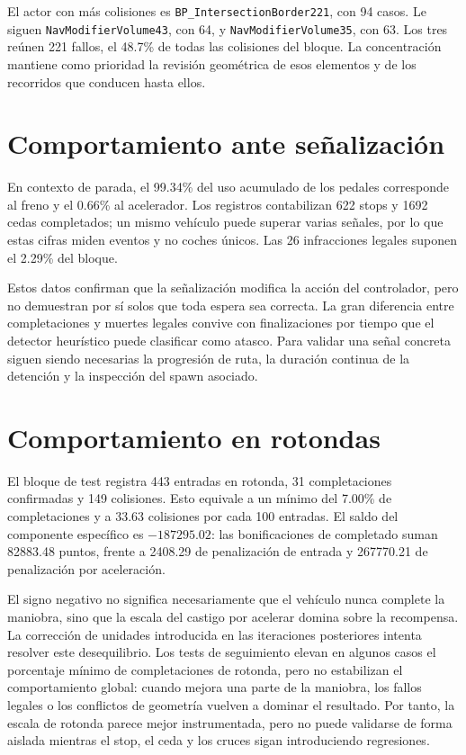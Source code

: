 El actor con más colisiones es \texttt{BP\_IntersectionBorder221}, con 94 casos. Le siguen \texttt{NavModifierVolume43}, con 64, y \texttt{NavModifierVolume35}, con 63. Los tres reúnen 221 fallos, el 48.7\% de todas las colisiones del bloque. La concentración mantiene como prioridad la revisión geométrica de esos elementos y de los recorridos que conducen hasta ellos.

\section{Comportamiento ante señalización}

En contexto de parada, el 99.34\% del uso acumulado de los pedales corresponde al freno y el 0.66\% al acelerador. Los registros contabilizan 622 stops y 1692 cedas completados; un mismo vehículo puede superar varias señales, por lo que estas cifras miden eventos y no coches únicos. Las 26 infracciones legales suponen el 2.29\% del bloque.

Estos datos confirman que la señalización modifica la acción del controlador, pero no demuestran por sí solos que toda espera sea correcta. La gran diferencia entre completaciones y muertes legales convive con finalizaciones por tiempo que el detector heurístico puede clasificar como atasco. Para validar una señal concreta siguen siendo necesarias la progresión de ruta, la duración continua de la detención y la inspección del spawn asociado.

\section{Comportamiento en rotondas}

El bloque de test registra 443 entradas en rotonda, 31 completaciones confirmadas y 149 colisiones. Esto equivale a un mínimo del 7.00\% de completaciones y a 33.63 colisiones por cada 100 entradas. El saldo del componente específico es \(-187295.02\): las bonificaciones de completado suman 82883.48 puntos, frente a 2408.29 de penalización de entrada y 267770.21 de penalización por aceleración.

El signo negativo no significa necesariamente que el vehículo nunca complete la maniobra, sino que la escala del castigo por acelerar domina sobre la recompensa. La corrección de unidades introducida en las iteraciones posteriores intenta resolver este desequilibrio. Los tests de seguimiento elevan en algunos casos el porcentaje mínimo de completaciones de rotonda, pero no estabilizan el comportamiento global: cuando mejora una parte de la maniobra, los fallos legales o los conflictos de geometría vuelven a dominar el resultado. Por tanto, la escala de rotonda parece mejor instrumentada, pero no puede validarse de forma aislada mientras el stop, el ceda y los cruces sigan introduciendo regresiones.

